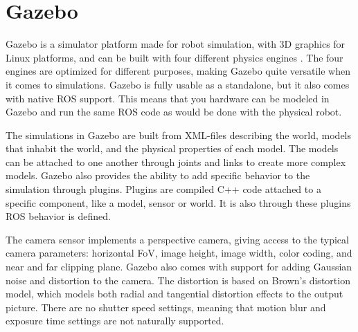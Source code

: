 \section{Gazebo} \label{sec:Gazebo}

Gazebo is a simulator platform made for robot simulation, with 3D graphics for Linux platforms, and can be built with four different physics engines \cite{Gazebo_phys}. The four engines are optimized for different purposes, making Gazebo quite versatile when it comes to simulations. Gazebo is fully usable as a standalone, but it also comes with native ROS support. This means that you hardware can be modeled in Gazebo and run the same ROS code as would be done with the physical robot.

The simulations in Gazebo are built from XML-files describing the world, models that inhabit the world, and the physical properties of each model. The models can be attached to one another through joints and links to create more complex models. Gazebo also provides the ability to add specific behavior to the simulation through plugins. Plugins are compiled C++ code attached to a specific component, like a model, sensor or world. It is also through these plugins ROS behavior is defined.

The camera sensor implements a perspective camera, giving access to the typical camera parameters: horizontal FoV, image height, image width, color coding, and near and far clipping plane. Gazebo also comes with support for adding Gaussian noise and distortion to the camera. The distortion is based on Brown's distortion model\cite{BrownModel}, which models both radial and tangential distortion effects to the output picture. There are no shutter speed settings, meaning that motion blur and exposure time settings are not naturally supported.

